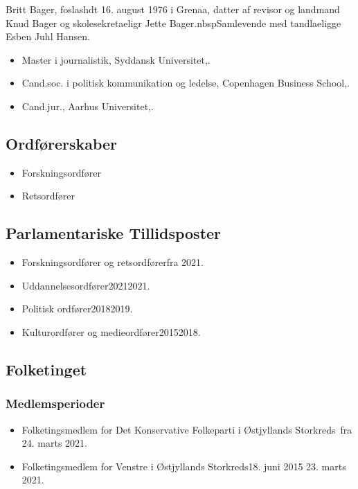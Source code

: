 \documentclass[11pt, a4paper]{awesome-cv}
\begin{document}
\makecvheader[R]
\makelettertitle
\begin{cvletter}
Britt Bager, foslashdt 16. august 1976 i Grenaa, datter af revisor og landmand Knud Bager og skolesekretaeligr Jette Bager.nbspSamlevende med tandlaeligge Esben Juhl Hansen.

\begin{itemize}
\item Master i journalistik, Syddansk Universitet,.
\item Cand.soc. i politisk kommunikation og ledelse, Copenhagen Business School,.
\item Cand.jur., Aarhus Universitet,.
\end{itemize}
\subsection*{Ordførerskaber}
\begin{itemize}
\item Forskningsordfører
\item Retsordfører
\end{itemize}
\subsection*{Parlamentariske Tillidsposter}
\begin{itemize}
\item Forskningsordfører og retsordførerfra 2021.
\item Uddannelsesordfører20212021.
\item Politisk ordfører20182019.
\item Kulturordfører og medieordfører20152018.
\end{itemize}
\subsection*{Folketinget}
\subsubsection*{Medlemsperioder}
\begin{itemize}
\item Folketingsmedlem for Det Konservative Folkeparti i Østjyllands Storkreds fra 24. marts 2021.
\item Folketingsmedlem for Venstre i Østjyllands Storkreds18. juni 2015  23. marts 2021.
\end{itemize}

\end{cvletter}
\end{document}
